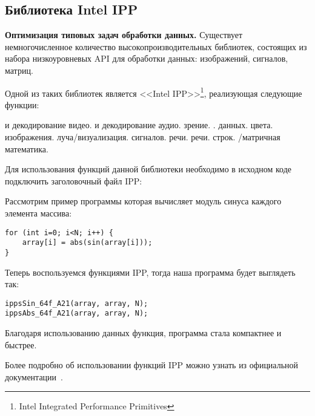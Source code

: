 \subsection{Библиотека Intel IPP}
\label{IPP:section}

\textbf{Оптимизация типовых задач обработки данных.} Существует немногочисленное количество высокопроизводительных библиотек, состоящих из набора низкоуровневых API для обработки данных: изображений, сигналов, матриц.

Одной из таких библиотек является <<Intel IPP>>\footnote{Intel Integrated Performance Primitives}, реализующая следующие функции:
\begin{itemize}
     и декодирование видео.
     и декодирование аудио.
     зрение.
    .
     данных.
     цвета.
     изображения.
     луча/визуализация.
     сигналов.
     речи.
     речи.
     строк.
    /матричная математика.
\end{itemize}

Для использования функций данной библиотеки необходимо в исходном коде подключить заголовочный файл IPP: 

Рассмотрим пример программы которая вычисляет модуль синуса каждого элемента массива:

\begin{verbatim}
for (int i=0; i<N; i++) {
    array[i] = abs(sin(array[i]));
}
\end{verbatim}

Теперь воспользуемся функциями IPP, тогда наша программа будет выглядеть так:

\begin{verbatim}
ippsSin_64f_A21(array, array, N);
ippsAbs_64f_A21(array, array, N);
\end{verbatim}

Благодаря использованию данных функция, программа стала компактнее и быстрее.

Более подробно об использовании функций IPP можно узнать из официальной документации~\cite{IppPrimitives}.
